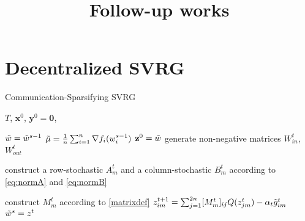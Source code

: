 \documentclass[a4paper,11pt]{article}
\title{Follow-up works}
\date{}
\author{}
\begin{document}
	\maketitle
	\vskip 0.1in
	
\section{Decentralized SVRG}

\begin{algorithm}[ht]
\caption{Communication-Sparsifying SVRG}
\label{alg:c}
\begin{algorithmic}
   $T$, %
   $\mathbf{x}^0$, %
   $\mathbf{y}^0=\mathbf{0}$, %
   
\STATE $\Tilde{w}=\Tilde{w}^{s-1}$
\STATE $\Tilde{\mu}= \frac{1}{n}\sum_{i=1}^n \nabla f_i(w_i^{s-1})$
\STATE $\mathbf{z}^0=\Tilde{w} $
\STATE generate non-negative matrices $W^t_{in}$, $W^t_{out}$

\STATE construct a row-stochastic $A^t_m$  and a column-stochastic $B^t_m$ according to \eqref{eq:normA} and \eqref{eq:normB}

\STATE construct $M^t_m$ according to \eqref{matrixdef}
\STATE $z_{im}^{t+1}=\sum_{j=1}^{2n}[M^t_m]_{ij} Q(z_{jm}^t)-\alpha_t \Tilde{g}_{im}^t$
\ENDFOR
\ENDFOR
\ENDFOR
\STATE $\Tilde{w}^s=z^{t}$
\ENDFOR

\end{algorithmic}
\end{algorithm}
\end{document}
